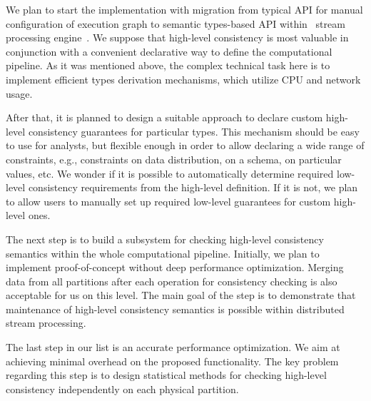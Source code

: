 We plan to start the implementation with migration from typical API for manual configuration of execution graph to semantic types-based API within \FlameStream\ stream processing engine~\cite{we2018beyondmr}. We suppose that high-level consistency is most valuable in conjunction with a convenient declarative way to define the computational pipeline. As it was mentioned above, the complex technical task here is to implement efficient types derivation mechanisms, which utilize CPU and network usage.

After that, it is planned to design a suitable approach to declare custom high-level consistency guarantees for particular types. This mechanism should be easy to use for analysts, but flexible enough in order to allow declaring a wide range of constraints, e.g., constraints on data distribution, on a schema, on particular values, etc.  We wonder if it is possible to automatically determine required low-level consistency requirements from the high-level definition. If it is not, we plan to allow users to manually set up required low-level guarantees for custom high-level ones.

The next step is to build a subsystem for checking high-level consistency semantics within the whole computational pipeline. Initially, we plan to implement proof-of-concept without deep performance optimization. Merging data from all partitions after each operation for consistency checking is also acceptable for us on this level. The main goal of the step is to demonstrate that maintenance of high-level consistency semantics is possible within distributed stream processing.

The last step in our list is an accurate performance optimization. We aim at achieving minimal overhead on the proposed functionality. The key problem regarding this step is to design statistical methods for checking high-level consistency independently on each physical partition.
